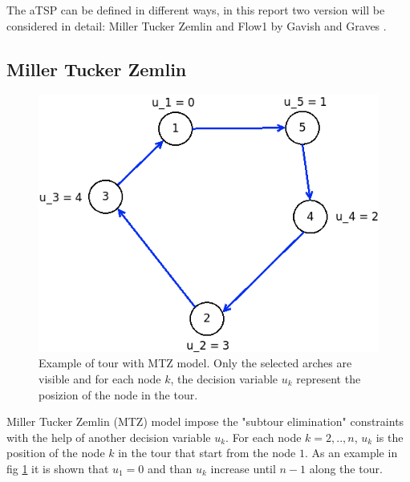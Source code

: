The aTSP can be defined in different ways, in this report two version will be considered in detail: Miller Tucker Zemlin \cite{miller1960integer} and Flow1 by Gavish and Graves \cite{gavish1978travelling}.


\subsection{Miller Tucker Zemlin}

\begin{figure}[h]
	\centering
	\includegraphics[width=.45\columnwidth]{img/asymTSP_MTZ_example.png}
	\caption{Example of tour with MTZ model. Only the selected arches are visible and for each node $ k $, the decision variable $ u_k $ represent the posizion of the node in the tour.}
	\label{fig:asymTSP_MTZ}
\end{figure}

Miller Tucker Zemlin (MTZ) model impose the "subtour elimination" constraints with the help of another decision variable $ u_k $. For each node $ k = 2,..,n $, $ u_k $ is the position of the node $ k $ in the tour that start from the node $ 1 $. As an example in fig \ref{fig:asymTSP_MTZ} it is shown that $ u_1 = 0 $ and than $ u_k $ increase until $ n-1 $ along the tour.

